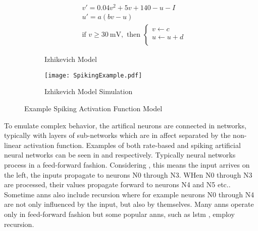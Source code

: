 \begin{figure}
\centering
\captionsetup{justification=centering}
\vspace{0.5cm}
\begin{subfigure}{.9\textwidth}
  \centering
  \begin{equation}
    \begin{split}
    &v' = 0.04v^2+5v + 140 - u - I\\
    &u' = a(bv-u)  \\
    &\text{if } v\ge  \SI{30}{\mV}, \text{ then } 
    \begin{cases}
        v \leftarrow c\\           
        u \leftarrow u+d\\           
    \end{cases} \nonumber
    \end{split}
  \end{equation}
  \caption{Izhikevich Model\cite{Iz2005}}
  \label{fig:Izhikevich Model}
  \end{subfigure}
\begin{subfigure}{.7\textwidth}
  \centering
  \mbox{\texttt{[image: SpikingExample.pdf]}}
  \captionsetup{justification=centering, skip=3pt}
  \caption{Izhikevich Model Simulation \cite{Iz2005}\cite{carnevale2006neuron}}
  \label{fig:spiking example}
\end{subfigure}
\caption{Example Spiking Activation Function Model}
\label{fig:Example Spiking Model}
\end{figure}

To emulate complex behavior, the artifical neurons are connected in networks, typically with layers of sub-networks which are in affect separated by the non-linear activation function.
Examples of both rate-based and spiking artificial neural networks can be seen in  and  respectively.
Typically neural networks process in a feed-forward fashion. Considering , this means the input arrives on the left, the inputs propagate to neurons N0 through N3. WHen N0 through N3 are processed, their values propagate forward to neurons N4 and N5 etc.. Sometime \ac{ann}s also include recursion where for example neurons N0 through N4 are not only influenced
by the input, but also by themselves. Many \ac{ann}s operate only in feed-forward fashion but some popular \ac{ann}s, such as \ac{lstm} \cite{hochreiter1997long}, employ recursion.

